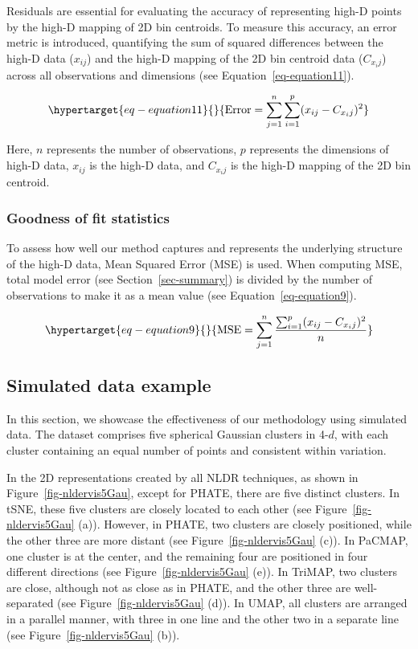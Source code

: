 \documentclass[
  12pt]{article}
\begin{document}
Residuals are essential for evaluating the accuracy of representing
high-D points by the high-D mapping of 2D bin centroids. To measure this
accuracy, an error metric is introduced, quantifying the sum of squared
differences between the high-D data (\(x_{ij}\)) and the high-D mapping
of the 2D bin centroid data (\(C_{x_ij}\)) across all observations and
dimensions (see Equation~\ref{eq-equation11}).

\begin{equation}\protect\hypertarget{eq-equation11}{}{
\text{Error} = \sum_{j = 1}^{n}\sum_{i = 1}^{p} (x_{ij} - C_{x_ij})^2
}\label{eq-equation11}\end{equation}

Here, \(n\) represents the number of observations, \(p\) represents the
dimensions of high-D data, \(x_{ij}\) is the high-D data, and
\(C_{x_ij}\) is the high-D mapping of the 2D bin centroid.

\hypertarget{sec-goodfit}{%
\subsubsection{Goodness of fit statistics}\label{sec-goodfit}}

To assess how well our method captures and represents the underlying
structure of the high-D data, Mean Squared Error (MSE) is used. When
computing MSE, total model error (see Section~\ref{sec-summary}) is
divided by the number of observations to make it as a mean value (see
Equation~\ref{eq-equation9}).

\begin{equation}\protect\hypertarget{eq-equation9}{}{
\text{MSE} = \sum_{j = 1}^{n} \frac{\sum_{i = 1}^{p} (x_{ij} - C_{x_ij})^2}{n}
}\label{eq-equation9}\end{equation}

\hypertarget{sec-simpleex}{%
\subsection{Simulated data example}\label{sec-simpleex}}

In this section, we showcase the effectiveness of our methodology using
simulated data. The dataset comprises five spherical Gaussian clusters
in 4-\(d\), with each cluster containing an equal number of points and
consistent within variation.

In the 2D representations created by all NLDR techniques, as shown in
Figure~\ref{fig-nldervis5Gau}, except for PHATE, there are five distinct
clusters. In tSNE, these five clusters are closely located to each other
(see Figure~\ref{fig-nldervis5Gau} (a)). However, in PHATE, two clusters
are closely positioned, while the other three are more distant (see
Figure~\ref{fig-nldervis5Gau} (c)). In PaCMAP, one cluster is at the
center, and the remaining four are positioned in four different
directions (see Figure~\ref{fig-nldervis5Gau} (e)). In TriMAP, two
clusters are close, although not as close as in PHATE, and the other
three are well-separated (see Figure~\ref{fig-nldervis5Gau} (d)). In
UMAP, all clusters are arranged in a parallel manner, with three in one
line and the other two in a separate line (see
Figure~\ref{fig-nldervis5Gau} (b)).
\end{document}
